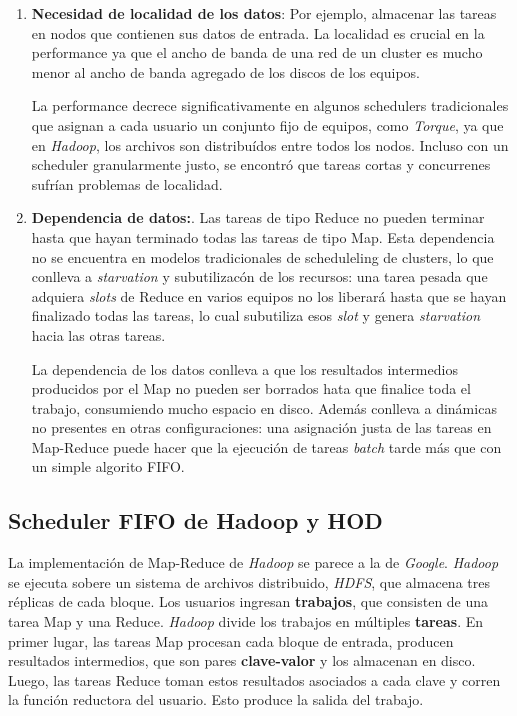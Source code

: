 \begin{enumerate}

\item \textbf{Necesidad de localidad de los datos}: Por ejemplo, almacenar las tareas en nodos que contienen sus datos de entrada. La localidad es crucial en la performance ya que el ancho de banda de una red de un cluster es mucho menor al ancho de banda agregado de los discos de los equipos.

La performance decrece significativamente en algunos schedulers tradicionales que asignan a cada usuario un conjunto fijo de equipos, como \emph{Torque}, ya que en \emph{Hadoop}, los archivos son distribu\'idos entre todos los nodos. Incluso con un scheduler granularmente justo, se encontr\'o que tareas cortas y concurrenes sufr\'ian problemas de localidad.

\item \textbf{Dependencia de datos:}. Las tareas de tipo Reduce no pueden terminar hasta que hayan terminado todas las tareas de tipo Map. Esta dependencia no se encuentra en modelos tradicionales de scheduleling de clusters, lo que conlleva a \emph{starvation} y subutilizac\'on de los recursos: una tarea pesada que adquiera \emph{slots} de Reduce en varios equipos no los liberar\'a hasta que se hayan finalizado todas las tareas, lo cual subutiliza esos \emph{slot} y genera \emph{starvation} hacia las otras tareas.

La dependencia de los datos conlleva a que los resultados intermedios producidos por el Map no pueden ser borrados hata que finalice toda el trabajo, consumiendo mucho espacio en disco. Adem\'as conlleva a din\'amicas no presentes en otras configuraciones: una asignaci\'on justa de las tareas en Map-Reduce puede hacer que la ejecuci\'on de tareas \emph{batch} tarde m\'as que con un simple algorito FIFO.

\end{enumerate}

\subsection{Scheduler FIFO de Hadoop y HOD}

La implementaci\'on de Map-Reduce de \emph{Hadoop} se parece a la de \emph{Google}. \emph{Hadoop} se ejecuta sobere un sistema de archivos distribuido, \emph{HDFS}, que almacena tres r\'eplicas de cada bloque. Los usuarios ingresan \textbf{trabajos}, que consisten de una tarea Map y una Reduce. \emph{Hadoop} divide los trabajos en m\'ultiples \textbf{tareas}. En primer lugar, las tareas Map procesan cada bloque de entrada, producen resultados intermedios, que son pares \textbf{clave-valor} y los almacenan en disco. Luego, las tareas Reduce toman estos resultados asociados a cada clave y corren la funci\'on reductora del usuario. Esto produce la salida del trabajo.

